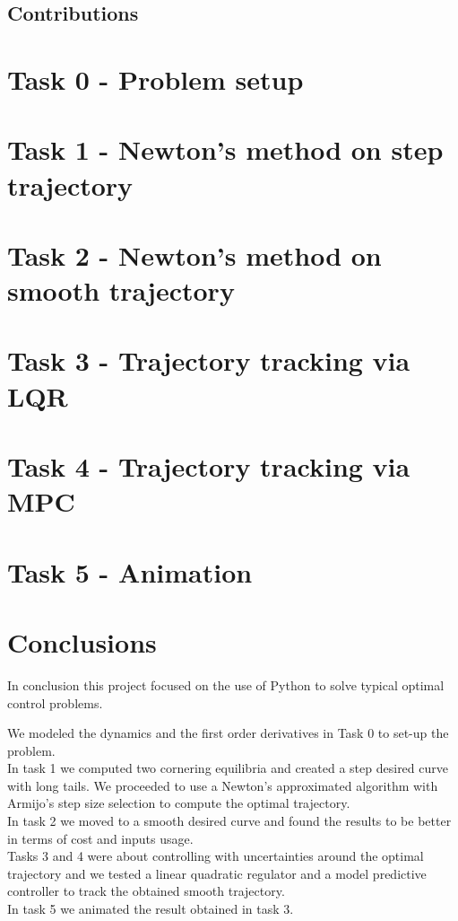 \documentclass[a4paper,11pt,oneside]{report}
\begin{document}
\section*{Contributions}




\chapter{Task 0 - Problem setup}

\chapter{Task 1 - Newton's method on step trajectory}

\chapter{Task 2 - Newton's method on smooth trajectory}

\chapter{Task 3 - Trajectory tracking via LQR}

\chapter{Task 4 - Trajectory tracking via MPC}

\chapter{Task 5 - Animation}

\chapter*{Conclusions}
In conclusion this project focused on the use of Python to solve typical optimal control problems.

\bigskip
We modeled the dynamics and the first order derivatives in Task 0 to set-up the problem.\\
In task 1 we computed two cornering equilibria and created a step desired curve with long tails.
We proceeded to use a Newton's approximated algorithm with Armijo's step size selection to compute the optimal 
trajectory.\\
In task 2 we moved to a smooth desired curve and found the results to be better in terms of cost and inputs usage.\\
Tasks 3 and 4 were about controlling with uncertainties around the optimal trajectory and we tested a linear 
quadratic regulator and a model predictive controller to track the obtained smooth trajectory.\\
In task 5 we animated the result obtained in task 3. 
% 

\end{document}

